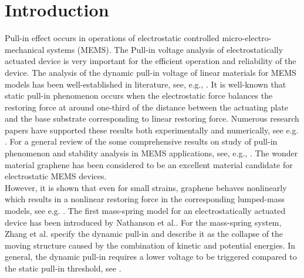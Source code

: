 \documentclass[review]{elsarticle}
\begin{document}
\section{{I}ntroduction}\label{sec:1}
Pull-in effect occurs in operations of electrostatic controlled micro-electro-mecha\-nical systems (MEMS).
The Pull-in voltage analysis of electrostatically actuated device is
very important for the efficient operation and reliability of the device.
The analysis of the dynamic pull-in voltage of linear materials for MEMS models has been well-established in literature, see, e.g., \cite{Younis}. It is well-known that static pull-in phenomenon occurs when the electrostatic force balances the restoring force at around one-third of the distance between the actuating plate and the base substrate corresponding to linear restoring force.
Numerous research papers have supported these results both experimentally and numerically, see e.g. \cite{ganji1,ganji2}. For a general review of the some comprehensive results on study of pull-in phenomenon and stability analysis in MEMS applications, see, e.g., \cite{Zhang}.
The wonder material graphene has been considered to be an excellent  material candidate for electrostatic MEMS devices.\\[2ex]
 However, it is shown that even for small strains, graphene behaves nonlinearly which results in a nonlinear restoring force in the corresponding lumped-mass models, see e.g. \cite{cadelano, Lee, Lu, malina}. The first mass-spring model for an electrostatically actuated device has been introduced by Nathanson et al.\cite{natanson}. For the mass-spring system, Zhang et al. \cite{Zhang} specify the dynamic pull-in and describe it as the collapse of the moving structure caused by the combination of kinetic and potential energies. In general,
the dynamic pull-in requires a lower voltage to be triggered compared to the static pull-in threshold, see \cite{flores,Zhang}. 
\end{document}
